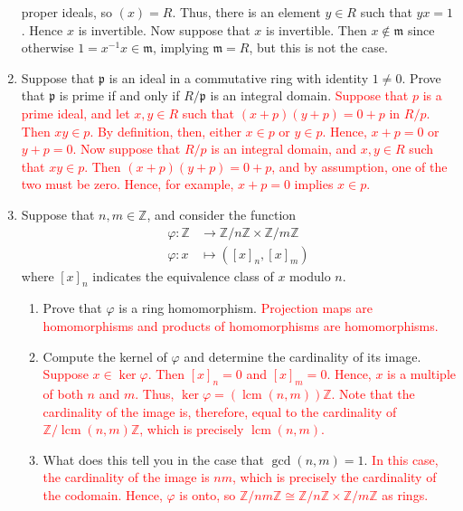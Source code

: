 \documentclass[12pt]{article}
\newcommand{\bbZ}{\mathbb{Z}}
\newcommand{\solution}[1]{\textcolor{red}{#1}}
\begin{document}
\begin{enumerate}
{  proper ideals, so $(x)=R$. Thus, there is an element $y\in R$ such
  that $yx=1$. Hence $x$ is invertible. Now suppose that $x$ is
  invertible. Then $x\notin \mathfrak{m}$ since otherwise
  $1=x^{-1}x\in \mathfrak{m}$, implying $\mathfrak{m}=R$, but this is
  not the case.}
\item Suppose that $\mathfrak{p}$ is an ideal in a commutative ring
  with identity $1\neq 0$. Prove that $\mathfrak{p}$ is prime if and only if
    $R/\mathfrak{p}$ is an integral domain. 
\solution{Suppose that $p$ is a prime ideal, and let $x, y\in
  R$ such that $(x+p)(y+p)=0+p$ in $R/p$. Then $xy\in p$. By
  definition, then, either $x\in p$ or $y\in p$. Hence, $x+p=0$ or
  $y+p=0$. 
Now suppose that $R/p$ is an integral domain, and $x,y\in R$ such that
$xy\in p$. Then $(x+p)(y+p)=0+p$, and by assumption, one of the two
must be zero. Hence, for example, $x+p=0$ implies $x\in p$.}
\item Suppose that $n,m\in \bbZ$, and consider the function 
  \begin{align*}
    \varphi: \bbZ & \rightarrow \bbZ/n\bbZ \times \bbZ/m\bbZ\\
    \varphi: x & \mapsto ([x]_n, [x]_m)
  \end{align*}
where $[x]_n$ indicates the equivalence class of $x$ modulo $n$.
\begin{enumerate}
\item Prove that $\varphi$ is a ring homomorphism.
\solution{Projection maps are homomorphisms and products of
  homomorphisms are homomorphisms.}
\item Compute the kernel of $\varphi$ and determine the cardinality of
  its image. 
\newcommand{\lcm}{\operatorname{lcm}}
\solution{Suppose $x\in \ker \varphi$. Then $[x]_n=0$ and
  $[x]_m=0$. Hence, $x$ is a multiple of both $n$ and $m$. Thus, $\ker
  \varphi=(\lcm(n,m))\bbZ$. Note that the cardinality of the image is,
therefore, equal to the cardinality of $\bbZ/\lcm(n,m)\bbZ$, which is
precisely $\lcm(n,m)$.}
\item What does this tell you in the case that $\gcd(n,m)=1$. 
\solution{In this case, the cardinality of the image is $nm$, which is
precisely the cardinality of the codomain. Hence, $\varphi$ is onto,
so $\bbZ/nm\bbZ \cong \bbZ/n\bbZ \times \bbZ/m\bbZ$ as rings.}
\end{enumerate}


\end{enumerate}
\end{document}
